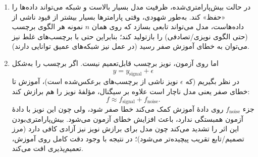 \begin{enumerate}
\item[(۱)]
در حالت بیش‌پارامتری‌شده، ظرفیت مدل بسیار بالاست و شبکه می‌تواند داده‌ها را «حفظ» کند. به‌طور شهودی، وقتی پارامترها بسیار بیشتر از قیود ناشی از داده‌هاست، مدل می‌تواند تابعی بسازد که روی همان $n$ نمونه هر الگوی برچسب (حتی الگوی نویزی/تصادفی) را بازتولید کند؛ بنابراین حتی با برچسب‌های غلط نیز می‌توان به خطای آموزش صفر رسید (در عمل نیز شبکه‌های عمیق توانایی  دارند).

\item[(۲)]
اما روی آزمون، نویز برچسب قابل‌تعمیم نیست. اگر برچسب را به‌شکل
\[
y = y_{\text{signal}} + \epsilon
\]
در نظر بگیریم (که $\epsilon$ نویز ناشی از برچسب‌های برعکس‌شده است)، آموزش تا خطای صفر یعنی مدل ناچار است علاوه بر سیگنال، مؤلفهٔ نویز را هم برازش کند:
\[
f \approx f_{\text{signal}} + f_{\text{noise}}.
\]
جزء $f_{\text{noise}}$ روی دادهٔ آموزش کمک می‌کند خطا صفر شود، ولی چون این نویز با دادهٔ آزمون همبستگی ندارد، باعث افزایش خطای آزمون می‌شود. بیش‌پارامتری‌بودن این اثر را تشدید می‌کند چون مدل برای برازش نویز نیز آزادی کافی دارد (مرز تصمیم/تابع تقریب پیچیده‌تر می‌شود)؛ در نتیجه با وجود دقت کامل روی آموزش، تعمیم‌پذیری افت می‌کند.
\end{enumerate}
